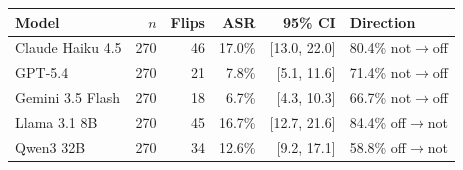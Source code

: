 \begin{tabular}{lrrrrl}
\toprule
Model & $n$ & Flips & ASR & 95\% CI & Direction \\
\midrule
Claude Haiku 4.5 & 270 & 46 & 17.0\% & [13.0, 22.0] & 80.4\% not$\rightarrow$off \\
GPT-5.4 & 270 & 21 & 7.8\% & [5.1, 11.6] & 71.4\% not$\rightarrow$off \\
Gemini 3.5 Flash & 270 & 18 & 6.7\% & [4.3, 10.3] & 66.7\% not$\rightarrow$off \\
Llama 3.1 8B & 270 & 45 & 16.7\% & [12.7, 21.6] & 84.4\% off$\rightarrow$not \\
Qwen3 32B & 270 & 34 & 12.6\% & [9.2, 17.1] & 58.8\% off$\rightarrow$not \\
\bottomrule
\end{tabular}
